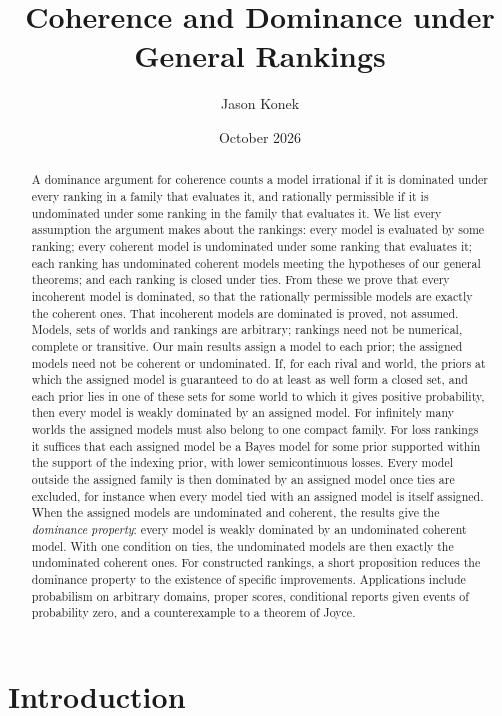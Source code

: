 \documentclass[11pt]{article}
\title{Coherence and Dominance under General Rankings}
\author{Jason Konek}
\date{October 2026}
\theoremstyle{definition}
\theoremstyle{remark}
\begin{document}
\maketitle

\begin{abstract}
A dominance argument for coherence counts a model irrational if it is dominated under every ranking in a family that evaluates it, and rationally permissible if it is undominated under some ranking in the family that evaluates it. We list every assumption the argument makes about the rankings: every model is evaluated by some ranking; every coherent model is undominated under some ranking that evaluates it; each ranking has undominated coherent models meeting the hypotheses of our general theorems; and each ranking is closed under ties. From these we prove that every incoherent model is dominated, so that the rationally permissible models are exactly the coherent ones. That incoherent models are dominated is proved, not assumed. Models, sets of worlds and rankings are arbitrary; rankings need not be numerical, complete or transitive. Our main results assign a model to each prior; the assigned models need not be coherent or undominated. If, for each rival and world, the priors at which the assigned model is guaranteed to do at least as well form a closed set, and each prior lies in one of these sets for some world to which it gives positive probability, then every model is weakly dominated by an assigned model. For infinitely many worlds the assigned models must also belong to one compact family. For loss rankings it suffices that each assigned model be a Bayes model for some prior supported within the support of the indexing prior, with lower semicontinuous losses. Every model outside the assigned family is then dominated by an assigned model once ties are excluded, for instance when every model tied with an assigned model is itself assigned. When the assigned models are undominated and coherent, the results give the \emph{dominance property}: every model is weakly dominated by an undominated coherent model. With one condition on ties, the undominated models are then exactly the undominated coherent ones. For constructed rankings, a short proposition reduces the dominance property to the existence of specific improvements. Applications include probabilism on arbitrary domains, proper scores, conditional reports given events of probability zero, and a counterexample to a theorem of Joyce.
\end{abstract}

\section{Introduction}\label{sec:intro}
\end{document}
